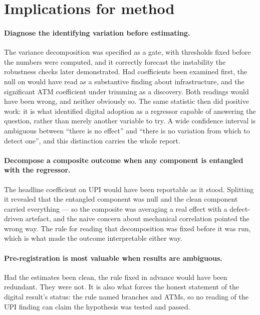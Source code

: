 \section{Implications for method}
\label{sec:method-implications}

\paragraph{Diagnose the identifying variation before estimating.} The variance decomposition was
specified as a gate, with thresholds fixed before the numbers were computed, and it correctly
forecast the instability the robustness checks later demonstrated. Had coefficients been examined
first, the null on \Access{} would have read as a substantive finding about infrastructure, and the
significant ATM coefficient under trimming as a discovery. Both readings would have been wrong, and
neither obviously so. The same statistic then did positive work: it is what identified digital
adoption as a regressor capable of answering the question, rather than merely another variable to
try. A wide confidence interval is ambiguous between ``there is no effect'' and ``there is no
variation from which to detect one'', and this distinction carries the whole report.

\paragraph{Decompose a composite outcome when any component is entangled with the regressor.} The
headline \Access{} coefficient on UPI would have been reportable as it stood. Splitting it revealed
that the entangled component was null and the clean component carried everything --- so the
composite was averaging a real effect with a defect-driven artefact, and the naive concern about
mechanical correlation pointed the wrong way. The rule for reading that decomposition was fixed
before it was run, which is what made the outcome interpretable either way.

\paragraph{Pre-registration is most valuable when results are ambiguous.} Had the estimates been
clean, the rule fixed in advance would have been redundant. They were not. It is also what forces
the honest statement of the digital result's status: the rule named branches and ATMs, so no
reading of the UPI finding can claim the hypothesis was tested and passed.

